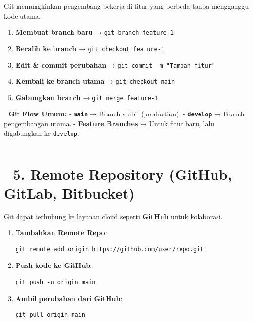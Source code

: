 \documentclass[
  letterpaper,
  DIV=11,
  numbers=noendperiod]{scrreprt}
\providecommand{\tightlist}{%
  \setlength{\itemsep}{0pt}\setlength{\parskip}{0pt}}\usepackage{longtable,booktabs,array}
\begin{document}
Git memungkinkan pengembang bekerja di fitur yang berbeda tanpa
mengganggu kode utama.

\begin{enumerate}
\def\labelenumi{\arabic{enumi}.}
\tightlist
\item
  \textbf{Membuat branch baru} → \texttt{git\ branch\ feature-1}
\item
  \textbf{Beralih ke branch} → \texttt{git\ checkout\ feature-1}
\item
  \textbf{Edit \& commit perubahan} →
  \texttt{git\ commit\ -m\ "Tambah\ fitur"}
\item
  \textbf{Kembali ke branch utama} → \texttt{git\ checkout\ main}
\item
  \textbf{Gabungkan branch} → \texttt{git\ merge\ feature-1}
\end{enumerate}

\textbf{🔀 Git Flow Umum:} - \textbf{\texttt{main}} → Branch stabil
(production). - \textbf{\texttt{develop}} → Branch pengembangan utama. -
\textbf{Feature Branches} → Untuk fitur baru, lalu digabungkan ke
\texttt{develop}.

\begin{center}\rule{0.5\linewidth}{0.5pt}\end{center}

\section{\texorpdfstring{🔹 \textbf{5. Remote Repository (GitHub,
GitLab,
Bitbucket)}}{🔹 5. Remote Repository (GitHub, GitLab, Bitbucket)}}\label{remote-repository-github-gitlab-bitbucket}

Git dapat terhubung ke layanan cloud seperti \textbf{GitHub} untuk
kolaborasi.

\begin{enumerate}
\def\labelenumi{\arabic{enumi}.}
\item
  \textbf{Tambahkan Remote Repo}:

\begin{verbatim}
git remote add origin https://github.com/user/repo.git
\end{verbatim}
\item
  \textbf{Push kode ke GitHub}:

\begin{verbatim}
git push -u origin main
\end{verbatim}
\item
  \textbf{Ambil perubahan dari GitHub}:

\begin{verbatim}
git pull origin main
\end{verbatim}
\end{enumerate}
\end{document}
